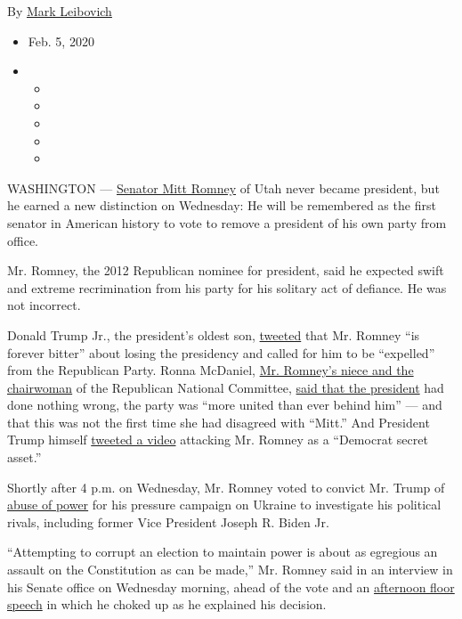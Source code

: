 By \href{https://www.nytimes3xbfgragh.onion/by/mark-leibovich}{Mark
Leibovich}

\begin{itemize}
\item
  Feb. 5, 2020
\item
  \begin{itemize}
  \item
  \item
  \item
  \item
  \item
  \end{itemize}
\end{itemize}

WASHINGTON ---
\href{https://www.nytimes3xbfgragh.onion/2020/02/06/podcasts/the-daily/mitt-romney.html}{Senator
Mitt Romney} of Utah never became president, but he earned a new
distinction on Wednesday: He will be remembered as the first senator in
American history to vote to remove a president of his own party from
office.

Mr. Romney, the 2012 Republican nominee for president, said he expected
swift and extreme recrimination from his party for his solitary act of
defiance. He was not incorrect.

Donald Trump Jr., the president's oldest son,
\href{https://twitter.com/DonaldJTrumpJr/status/1225140190920019968}{tweeted}
that Mr. Romney ``is forever bitter'' about losing the presidency and
called for him to be ``expelled'' from the Republican Party. Ronna
McDaniel,
\href{https://www.nytimes3xbfgragh.onion/2018/01/13/us/politics/ronna-romney-mcdaniel.html}{Mr.
Romney's niece and the chairwoman} of the Republican National Committee,
\href{https://twitter.com/GOPChairwoman/status/1225140565131571200}{said
that the president} had done nothing wrong, the party was ``more united
than ever behind him'' --- and that this was not the first time she had
disagreed with ``Mitt.'' And President Trump himself
\href{https://twitter.com/realDonaldTrump/status/1225203837226700800}{tweeted
a video} attacking Mr. Romney as a ``Democrat secret asset.''

Shortly after 4 p.m. on Wednesday, Mr. Romney voted to convict Mr. Trump
of
\href{https://www.nytimes3xbfgragh.onion/interactive/2020/01/22/us/politics/impeachment-articles-arguments.html}{abuse
of power} for his pressure campaign on Ukraine to investigate his
political rivals, including former Vice President Joseph R. Biden Jr.

``Attempting to corrupt an election to maintain power is about as
egregious an assault on the Constitution as can be made,'' Mr. Romney
said in an interview in his Senate office on Wednesday morning, ahead of
the vote and an
\href{https://www.nytimes3xbfgragh.onion/2020/02/05/us/politics/mitt-romney-impeachment-speech-transcript.html}{afternoon
floor speech} in which he choked up as he explained his decision.

